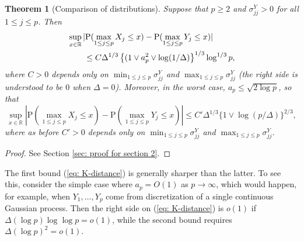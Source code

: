 \documentclass[11pt,reqno]{amsart}
\newtheorem{theorem}{Theorem}
\theoremstyle{definition}
\renewcommand{\Pr}{{\mathrm{P}}}
\newcommand{\RR}{\mathbb{R}}
\begin{document}
\begin{theorem}[Comparison of distributions]\label{cor: distances Gaussian to Gaussian}
Suppose that $p \geq 2$ and $\sigma^{Y}_{jj} > 0$ for all $1 \leq j \leq p$.   Then
\begin{align}
&\sup_{x \in\RR} | \Pr ( \max_{1 \leq j \leq p} X_{j}\leq x ) -\Pr ( \max_{1 \leq j \leq p} Y_{j}\leq x ) | \notag \\
&\qquad \leq C \Delta^{1/3} \left  \{ (1 \vee a_{p}^{2} \vee \log (1/\Delta ) \right  \}^{1/3}  \log^{1/3} p,  \label{eq: K-distance}
\end{align}
where $C>0$ depends only on $\min_{1 \leq j \leq p} \sigma_{jj}^{Y}$ and $\max_{1 \leq j \leq p} \sigma_{jj}^{Y}$ (the right side is understood to be $0$ when $\Delta = 0$). Moreover, in the worst case, $a_{p} \leq \sqrt{2 \log p}$, so that
\[
\sup_{x \in\RR} | \Pr ( \max_{1 \leq j \leq p} X_{j}\leq x ) -\Pr ( \max_{1 \leq j \leq p} Y_{j}\leq x ) | \leq C' \Delta^{1/3} \{1 \vee \log (p/\Delta)\}^{2/3},
\]
where as before $C' > 0$ depends only on $\min_{1 \leq j \leq p} \sigma_{jj}^{Y}$ and $\max_{1 \leq j \leq p} \sigma_{jj}^{Y}$.
\end{theorem}
\begin{proof}
See Section \ref{sec: proof for section 2}.
\end{proof}

The first bound (\ref{eq: K-distance}) is generally sharper than the latter. To see this, consider the simple case where $a_{p} = O(1)$ as $p \to \infty$, which would happen, for example, when $Y_{1},\dots,Y_{p}$ come from discretization of a single continuous Gaussian process. Then the right side on (\ref{eq: K-distance}) is $o(1)$ if $\Delta (\log p) \log \log p= o(1)$, while the second bound requires $\Delta (\log p)^{2}= o(1)$.
\end{document}
